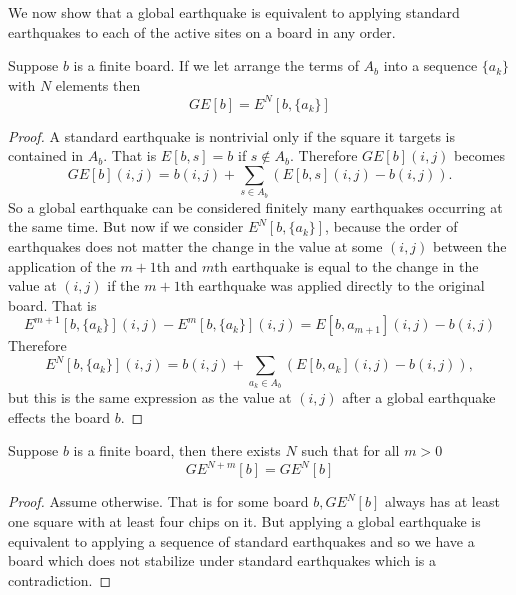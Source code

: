 \documentclass[runningheads,a4paper]{llncs}
\begin{document}
We now show that a global earthquake is equivalent to applying standard earthquakes to each of the active sites on a board in any order.
\begin{lemma} Suppose $b$ is a finite board. If we let arrange the terms of $A_b$ into a sequence $\{a_k\}$ with $N$ elements then 
\begin{equation*}
GE[b] = E^N[b, \{a_k\}]
\end{equation*}
\end{lemma}
\begin{proof} 
A standard earthquake is nontrivial only if the square it targets is contained in $A_b$. That is $E[b, s] = b$  if $s \notin A_b$. Therefore $GE[b](i,j)$ becomes
\begin{equation*}
GE[b](i,j) = b(i,j) +\sum_{s \in A_b} (E[b, s](i,j) - b(i,j)).
\end{equation*}
So a global earthquake can be considered finitely many earthquakes occurring at the same time. But now if we consider $E^N[b, \{a_k\}]$, because the order of earthquakes does not matter the change in the value at some $(i,j)$ between the application of the $m+1$th and $m$th earthquake is equal to the change in the value at $(i,j)$ if the $m+1$th earthquake was applied directly to the original board. That is 
\begin{equation*}
E^{m+1}[b, \{a_k\}](i,j) - E^{m}[b, \{a_k\}](i,j) = E[b, a_{m+1} ](i,j) - b(i,j)
\end{equation*}
Therefore 
\begin{equation*}
E^N[b, \{a_k\}](i,j) = b(i,j) + \sum_{a_k \in A_b} (E[b, a_k](i,j) - b(i,j)),
\end{equation*}
but this is the same expression as the value at $(i,j)$ after a global earthquake effects the board $b$. 
\end{proof}

\begin{theorem} Suppose $b$ is a finite board, then there exists $N$ such that for all $m>0$ 
\begin{equation*}
GE^{N+m}[b] = GE^{N}[b]
\end{equation*}
\end{theorem}
\begin{proof}
Assume otherwise. That is for some board $b, GE^N[b]$ always has at least one square with at least four chips on it. But applying a global earthquake is equivalent to applying a sequence of standard earthquakes and so we have a board which does not stabilize under standard earthquakes which is a contradiction.  
\end{proof}
\end{document}
